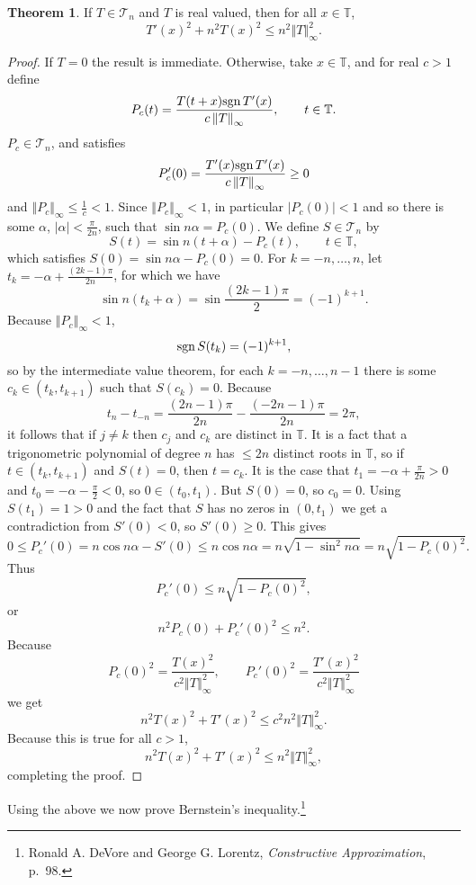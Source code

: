 \documentclass{article}
\newcommand{\sgn}{\ensuremath\mathrm{sgn}\,}
\newcommand{\norm}[1]{\left\Vert #1 \right\Vert}
\theoremstyle{definition}
\newtheorem{theorem}{Theorem}
\theoremstyle{definition}
\begin{document}
\begin{theorem}
If $T \in \mathscr{T}_n$ and $T$ is real valued, then for all $x \in \mathbb{T}$,
\[
T'(x)^2+n^2 T(x)^2 \leq n^2 \norm{T}_\infty^2.
\]
\label{szego}
\end{theorem}
\begin{proof}
If $T=0$ the result is immediate. Otherwise, take $x \in \mathbb{T}$,
and for real $c>1$ define 
\[
P_c(t)=\frac{T(t+x) \sgn T'(x)}{c \norm{T}_\infty}, \qquad t \in \mathbb{T}.
\]
$P_c \in \mathscr{T}_n$, and satisfies
\[
P_c'(0) = \frac{T'(x) \sgn T'(x)}{c \norm{T}_\infty} \geq 0
\]
and $\norm{P_c}_\infty \leq \frac{1}{c}<1$.
Since $\norm{P_c}_\infty < 1$, in particular $|P_c(0)|<1$ and so there is some
$\alpha$, $|\alpha|<\frac{\pi}{2n}$, such that $\sin n\alpha = P_c(0)$. 
We define $S \in \mathscr{T}_n$ by
\[
S(t) = \sin n(t+\alpha)-P_c(t), \qquad t \in \mathbb{T},
\]
which satisfies $S(0)=\sin n\alpha-P_c(0)=0$.
For $k=-n,\ldots,n$, let $t_k=-\alpha+\frac{(2k-1)\pi}{2n}$, for which we have
\[
\sin n(t_k+\alpha) = \sin \frac{(2k-1)\pi}{2} = (-1)^{k+1}.
\]
Because $\norm{P_c}_\infty<1$, 
\[
\sgn S(t_k) =  (-1)^{k+1},
\]
so by the intermediate value theorem, for each $k=-n,\ldots,n-1$ there is some $c_k \in (t_k,t_{k+1})$ such that
$S(c_k)=0$.
Because
\[
t_n-t_{-n} = \frac{(2n-1)\pi}{2n}-\frac{(-2n-1)\pi}{2n}=
2\pi,
\]
it follows that if $j \neq k$ then $c_j$ and $c_k$ are distinct in $\mathbb{T}$.
It is a fact that a trigonometric polynomial of degree $n$ has $\leq 2n$ distinct roots in $\mathbb{T}$, so if
$t \in (t_k,t_{k+1})$ and $S(t)=0$, then $t=c_k$. 
It is the case that $t_1=-\alpha+\frac{\pi}{2n}>0$ and $t_0=-\alpha-\frac{\pi}{2}<0$, so
$0 \in (t_0,t_1)$. But $S(0)=0$, so $c_0=0$. 
Using $S(t_1)=1>0$ and the fact that $S$ has no zeros in $(0,t_1)$ we get a contradiction from $S'(0) < 0$, so $S'(0) \geq 0$. 
This gives
\[
0 \leq P_c'(0) = n\cos n\alpha-S'(0) \leq n\cos n\alpha=n\sqrt{1-\sin^2 n\alpha} = n\sqrt{1-P_c(0)^2}.
\]
Thus
\[
P_c'(0) \leq n\sqrt{1-P_c(0)^2},
\]
or
\[
n^2 P_c(0)+P_c'(0)^2 \leq n^2.
\]
Because
\[
P_c(0)^2=\frac{T(x)^2}{c^2 \norm{T}_\infty^2}, \qquad
P_c'(0)^2 = \frac{T'(x)^2}{c^2\norm{T}_\infty^2}
\]
we get
\[
n^2 T(x)^2 + T'(x)^2 \leq c^2 n^2 \norm{T}_\infty^2.
\]
Because this is true for all $c>1$,
\[
n^2 T(x)^2 + T'(x)^2 \leq n^2 \norm{T}_\infty^2,
\]
completing the proof.
\end{proof}

Using the above we now prove Bernstein's inequality.\footnote{Ronald A. DeVore and George G. Lorentz,
{\em Constructive Approximation}, p.~98.}
\end{document}
